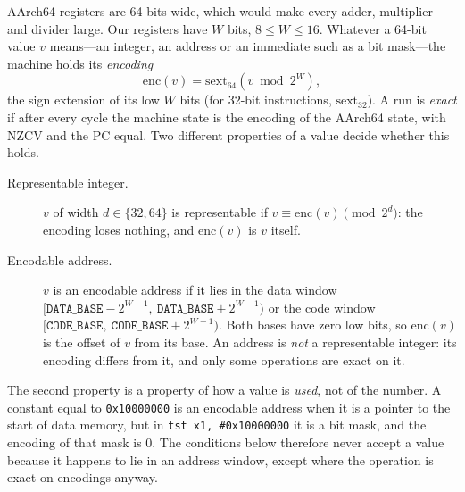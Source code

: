 \documentclass[11pt]{article}
\begin{document}
AArch64 registers are 64 bits wide, which would make every adder, multiplier and divider large. Our
registers have $W$ bits, $8\le W\le16$. Whatever a 64-bit value $v$ means---an integer, an address or
an immediate such as a bit mask---the machine holds its \emph{encoding}
\[
  \mathrm{enc}(v) = \mathrm{sext}_{64}(v \bmod 2^W),
\]
the sign extension of its low $W$ bits (for 32-bit instructions, $\mathrm{sext}_{32}$). A run is
\emph{exact} if after every cycle the machine state is the encoding of the AArch64 state, with NZCV
and the PC equal. Two different properties of a value decide whether this holds.

\begin{description}
  \item[Representable integer.] $v$ of width $d\in\{32,64\}$ is representable if
        $v \equiv \mathrm{enc}(v) \pmod{2^d}$: the encoding loses nothing, and $\mathrm{enc}(v)$
        is $v$ itself.
  \item[Encodable address.] $v$ is an encodable address if it lies in the data window
        $[\mathtt{DATA\_BASE}-2^{W-1},\ \mathtt{DATA\_BASE}+2^{W-1})$ or the code window
        $[\mathtt{CODE\_BASE},\ \mathtt{CODE\_BASE}+2^{W-1})$. Both bases have zero low bits, so
        $\mathrm{enc}(v)$ is the offset of $v$ from its base. An address is \emph{not} a representable
        integer: its encoding differs from it, and only some operations are exact on it.
\end{description}

\noindent The second property is a property of how a value is \emph{used}, not of the number. A
constant equal to \texttt{0x10000000} is an encodable address when it is a pointer to the start of data
memory, but in \texttt{tst x1, \#0x10000000} it is a bit mask, and the encoding of that mask is 0. The
conditions below therefore never accept a value because it happens to lie in an address window, except
where the operation is exact on encodings anyway.
\end{document}

